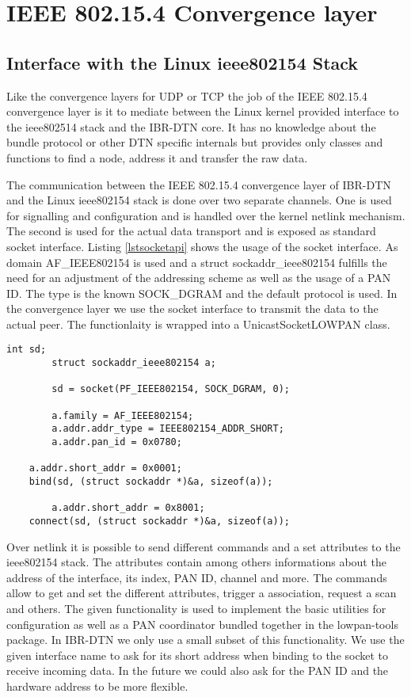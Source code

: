 \chapter{IEEE 802.15.4 Convergence layer}
\label{802154layer}
\section{Interface with the Linux ieee802154 Stack}

Like the convergence layers for UDP or TCP the job of the IEEE 802.15.4
convergence layer is it to mediate between the Linux kernel provided interface
to the ieee802514 stack and the IBR-DTN core. It has no knowledge about the
bundle protocol or other DTN specific internals but provides only classes and
functions to find a node, address it and transfer the raw data.

The communication between the IEEE 802.15.4 convergence layer of IBR-DTN and the
Linux ieee802154 stack is done over two separate channels. One is used for
signalling and configuration and is handled over the kernel netlink mechanism.
The second is used for the actual data transport and is exposed as standard
socket interface. Listing \ref{lstsocketapi} shows the usage of the socket interface.
As domain AF\_IEEE802154 is used and a struct sockaddr\_ieee802154 fulfills the
need for an adjustment of the addressing scheme as well as the usage of a PAN
ID. The type is the known SOCK\_DGRAM and the default protocol is used. In the
convergence layer we use the socket interface to transmit the data to the actual
peer. The functionlaity is wrapped into a UnicastSocketLOWPAN class.

\begin{lstlisting}[caption= ieee802154 socket interface, label=lstsocketapi]
        int sd;
        struct sockaddr_ieee802154 a;

        sd = socket(PF_IEEE802154, SOCK_DGRAM, 0);

        a.family = AF_IEEE802154;
        a.addr.addr_type = IEEE802154_ADDR_SHORT;
        a.addr.pan_id = 0x0780;

	a.addr.short_addr = 0x0001;
	bind(sd, (struct sockaddr *)&a, sizeof(a));

        a.addr.short_addr = 0x8001;
	connect(sd, (struct sockaddr *)&a, sizeof(a));
\end{lstlisting}

Over netlink it is possible to send different commands and a set attributes to the
ieee802154 stack. The attributes contain among others informations about the
address of the interface, its index, PAN ID, channel and more. The commands
allow to get and set the different attributes, trigger a association, request a
scan and others. The given functionality is used to implement the basic
utilities for configuration as well as a PAN coordinator bundled together in
the lowpan-tools package. In IBR-DTN we only use a small subset of this
functionality. We use the given interface name to ask for its short address when
binding to the socket to receive incoming data. In the future we could also ask for
the PAN ID and the hardware address to be more flexible.

